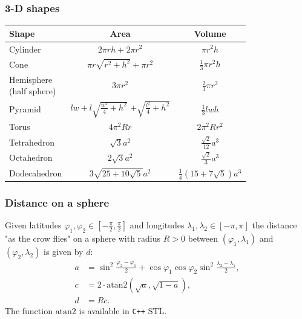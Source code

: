 \subsubsection{3-D shapes}
\begin{table}[H]
    \centering
    \begin{tabular}{|l|c|c|}
        \hline
        Shape & Area & Volume \\
        \hline
        Cylinder & $2\pi rh + 2\pi r^2$ & $\pi r^2 h$ \\
        Cone & $\pi r\sqrt{r^2+h^2} + \pi r^2$ & $\frac13 \pi r^2 h$ \\
        \makecell[l]{Hemisphere\\(half sphere)} & $3\pi r^2$ & $\frac23\pi r^3$ \\
        Pyramid & \makecell{$lw + l\sqrt{\frac{w^2}4 + h^2}$\\$+ \sqrt{\frac{l^2}4 + h^2}$} & $\frac13lwh$ \\
        Torus & $4\pi^2Rr$ & $2\pi^2Rr^2$ \\
        Tetrahedron & $\sqrt3 a^2$ & $\frac{\sqrt2}{12}a^3$ \\
        Octahedron & $2\sqrt3 a^2$ & $\frac{\sqrt2}3 a^3$ \\
        Dodecahedron & $3\sqrt{25 + 10\sqrt5}a^2$ & $\frac14(15 + 7\sqrt5)a^3$ \\
        \hline
    \end{tabular}
    \label{tab:shapes}
\end{table}

\subsubsection{Distance on a sphere}
Given latitudes $\varphi_1, \varphi_2 \in [-\frac\pi2, \frac\pi2]$ and longitudes $\lambda_1, \lambda_2 \in [-\pi, \pi]$ the distance "as the crow flies" on a sphere with radius $R > 0$ between $(\varphi_1, \lambda_1)$ and $(\varphi_2, \lambda_2)$ is given by $d$:
\begin{align*}
    a &= \sin^2\frac{\varphi_2 - \varphi_1}2 + \cos\varphi_1 \cos\varphi_2 \sin^2\frac{\lambda_2 - \lambda_1}2, \\
    c &= 2\cdot\text{atan2}(\sqrt a, \sqrt{1 - a}), \\
    d &= Rc.
\end{align*}
The function $\text{atan2}$ is available in \texttt{C++} STL.


